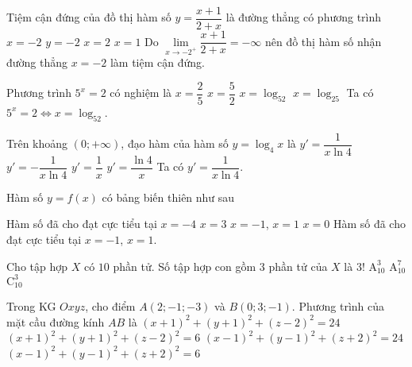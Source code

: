 \begin{ex}%
Tiệm cận đứng của đồ thị hàm số $y=\dfrac{x+1}{2+x}$ là đường thẳng có phương trình 
		\choice
		{\True $x=-2$}
		{$y=-2$}
		{$x=2$}
		{$x=1$}
	\loigiai
	{
		Do $\lim\limits_{x\to -2^+}\dfrac{x+1}{2+x}=-\infty$ nên đồ thị hàm số nhận đường thẳng $x=-2$ làm tiệm cận đứng.
	} 
\end{ex}
\begin{ex}%
Phương trình $5^x=2$ có nghiệm là
		\choice
		{$x=\dfrac{2}{5}$}
		{$x=\dfrac{5}{2}$}
		{\True $x=\log_52$}
		{$x=\log_25$}
	\loigiai
	{
		Ta có $5^x=2\Leftrightarrow x=\log_52$.
	}
\end{ex}
\begin{ex}%
	Trên khoảng $(0;+\infty)$, đạo hàm của hàm số $y=\log_4x$ là
	\choice
	{\True $y'=\dfrac{1}{x\ln 4}$}
	{$y'=-\dfrac{1}{x\ln 4}$}
	{$y'=\dfrac{1}{x}$}
	{$y'=\dfrac{\ln 4}{x}$}
	\loigiai
	{
		Ta có $y'=\dfrac{1}{x\ln 4}$.
	}
\end{ex}
\begin{ex}%
	Hàm số $y=f(x)$ có bảng biến thiên như sau
	\begin{center}
	\end{center}
Hàm số đã cho đạt cực tiểu tại
		\choice
		{$x=-4$}
		{$x=3$}
		{\True $x=-1$, $x=1$}
		{$x=0$}
	\loigiai
	{
		Hàm số đã cho đạt cực tiểu tại $x=-1$, $x=1$.
	}
\end{ex}
\begin{ex}%
Cho tập hợp $X$ có $10$ phần tử. Số tập hợp con gồm $3$ phần tử của $X$ là
	\choice
	{$3!$}
	{$\mathrm{A}_{10}^3$}
	{$\mathrm{A}_{10}^7$}
	{\True $\mathrm{C}_{10}^3$}
\end{ex}
\begin{ex}%
	Trong KG $Oxyz$, cho điểm $A(2;-1;-3)$ và $B(0;3;-1)$. Phương trình của mặt cầu đường kính $AB$ là
	\choice
	{$(x+1)^2+(y+1)^2+(z-2)^2=24$}
	{$(x+1)^2+(y+1)^2+(z-2)^2=6$}
	{$(x-1)^2+(y-1)^2+(z+2)^2=24$}
	{\True $(x-1)^2+(y-1)^2+(z+2)^2=6$}
\end{ex}
